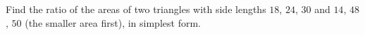 Find the ratio of the areas of two triangles with side lengths $18$, $24$, $30$ and $14$, $48$, $50$ (the smaller area first), in simplest form.
